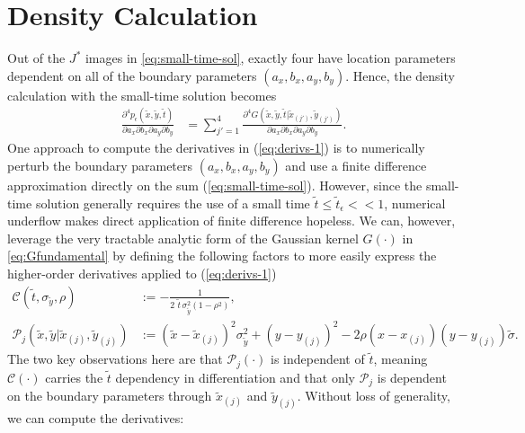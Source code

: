 \section{Density Calculation}
Out of the $J^*$ images in \eqref{eq:small-time-sol}, exactly four
have location parameters dependent on all of the boundary parameters
$(a_x, b_x, a_y, b_y)$. Hence, the density calculation with the
small-time solution becomes
\begin{align}
  \frac{\partial^4 p_\epsilon(\tilde{x}, \tilde{y}, \tilde{t})}{\partial a_x \partial b_x \partial a_y \partial b_y}  &= \sum_{j'=1}^{4}
                                                                                                                        \frac{\partial^4G(\tilde{x},\tilde{y},\tilde{t}|\tilde{x}_{(j')},\tilde{y}_{(j')})}{\partial a_x \partial b_x \partial a_y \partial b_y}. \label{eq:derivs-1}
\end{align}
One approach to compute the derivatives in (\ref{eq:derivs-1}) is to
numerically perturb the boundary parameters $(a_x,b_x,a_y,b_y)$ and
use a finite difference approximation directly on the sum
(\ref{eq:small-time-sol}). However, since the small-time solution
generally requires the use of a small time
$\tilde{t} \leq \tilde{t}_\epsilon << 1$, numerical underflow makes
direct application of finite difference hopeless.  We can, however,
leverage the very tractable analytic form of the Gaussian kernel
$G(\cdot)$ in \eqref{eq:Gfundamental} by defining the following
factors to more easily express the higher-order derivatives applied to
(\ref{eq:derivs-1})
\begin{align}
  \mathcal{C}(\tilde{t}, \sigma_{\tilde{y}}, \rho) &:= -\frac{1}{2\,\,\tilde{t}\, \sigma_{\tilde{y}}^2 (1-\rho^2)}, \\
  \mathcal{P}_j(\tilde{x},\tilde{y} | \tilde{x}_{(j)}, \tilde{y}_{(j)}) &:= \left(\tilde{x}- \tilde{x}_{(j)}\right)^2 \sigma_{\tilde{y}}^2 + \left(y-y_{(j)}\right)^2 - 2\rho(x-x_{(j)})(y-y_{(j)})\tilde{\sigma}.
\end{align}
The two key observations here are that $\mathcal{P}_j(\cdot)$ is
independent of $\tilde{t}$, meaning $\mathcal{C}(\cdot)$ carries the
$\tilde{t}$ dependency in differentiation and that only
$\mathcal{P}_j$ is dependent on the boundary parameters through
$\tilde{x}_{(j)}$ and $\tilde{y}_{(j)}$. Without loss of generality,
we can compute the derivatives:
